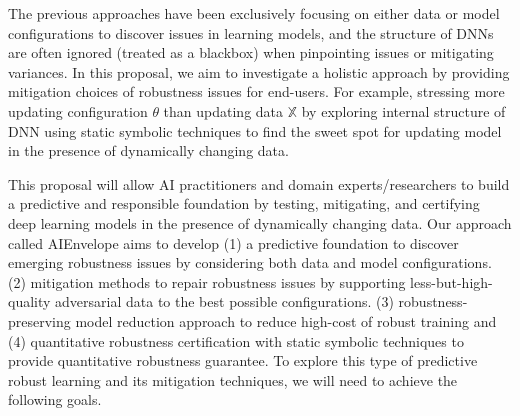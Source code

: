 The previous approaches have been exclusively focusing on either data or model configurations to discover issues in learning models, and the structure of DNNs are often ignored (treated as a blackbox) when pinpointing issues or mitigating variances.
In this proposal, we aim to investigate a holistic approach by providing mitigation choices of robustness issues for end-users. For example, stressing more updating configuration $\theta$ than updating data $\mathbb{X}$ by exploring internal structure of DNN using static symbolic techniques to find the sweet spot for updating model in the presence of dynamically  changing data. 

This proposal will allow AI practitioners and domain experts/researchers to build a predictive and responsible foundation by testing, mitigating, and certifying deep learning models in the presence of dynamically changing data. 
Our approach called \mbox{AIEnvelope} aims to develop (1) a predictive foundation to discover emerging robustness issues by considering both data and model configurations.
(2) mitigation methods to repair robustness issues by supporting less-but-high-quality adversarial data to the best possible configurations.
(3) robustness-preserving model reduction approach to reduce high-cost of robust training and (4) quantitative robustness certification with static symbolic techniques to provide quantitative robustness guarantee.
To explore this type of predictive robust learning and its mitigation techniques, we will need to achieve the following goals. 


